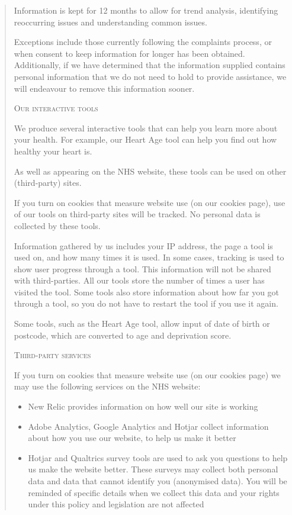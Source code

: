 \documentclass[twocolumn, letterpaper,13pt]{scrartcl}
\begin{document}
\begin{quote}
        Information is kept for 12 months to allow for trend analysis, identifying reoccurring issues and understanding common issues.
        
        Exceptions include those currently following the complaints process, or when consent to keep information for longer has been obtained. Additionally, if we have determined that the information supplied contains personal information that we do not need to hold to provide assistance, we will endeavour to remove this information sooner.
        
        \textsc{Our interactive tools}
        
        We produce several interactive tools that can help you learn more about your health. For example, our Heart Age tool can help you find out how healthy your heart is.
        
        As well as appearing on the NHS website, these tools can be used on other (third-party) sites.
        
        If you turn on cookies that measure website use (on our cookies page), use of our tools on third-party sites will be tracked. No personal data is collected by these tools.
        
        Information gathered by us includes your IP address, the page a tool is used on, and how many times it is used. In some cases, tracking is used to show user progress through a tool. This information will not be shared with third-parties. All our tools store the number of times a user has visited the tool. Some tools also store information about how far you got through a tool, so you do not have to restart the tool if you use it again.
        
        Some tools, such as the Heart Age tool, allow input of date of birth or postcode, which are converted to age and deprivation score.
        
        \textsc{Third-party services}
        
        If you turn on cookies that measure website use (on our cookies page) we may use the following services on the NHS website:
        
        \begin{itemize}
            \item New Relic provides information on how well our site is working
            \item Adobe Analytics, Google Analytics and Hotjar collect information about how you use our website, to help us make it better
            \item Hotjar and Qualtrics survey tools are used to ask you questions to help us make the website better. These surveys may collect both personal data and data that cannot identify you (anonymised data). You will be reminded of specific details when we collect this data and your rights under this policy and legislation are not affected
        \end{itemize}
        

\end{quote}
\end{document}
